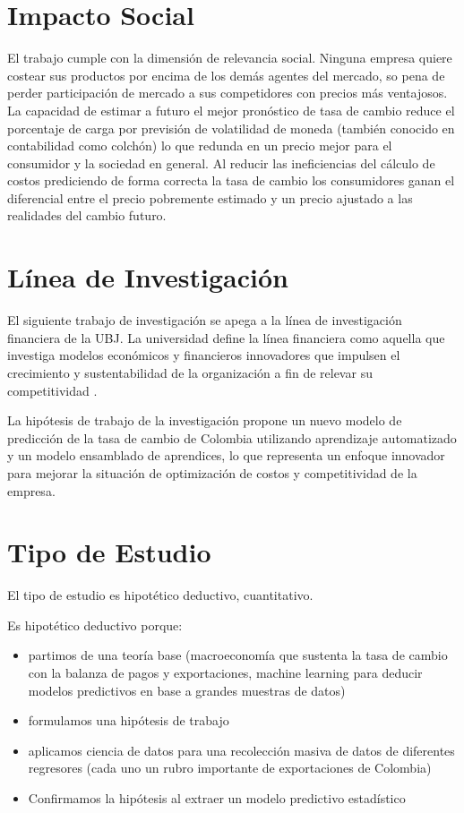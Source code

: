 \section{Impacto Social}
El trabajo cumple con la dimensión de relevancia social. Ninguna empresa quiere costear sus productos por encima de los demás agentes del mercado, so pena de perder participación de mercado a sus competidores con precios más ventajosos. La capacidad de estimar a futuro el mejor pronóstico de tasa de cambio reduce el porcentaje de carga por previsión de volatilidad de moneda (también conocido en contabilidad como colchón) lo que redunda en un precio mejor para el consumidor y la sociedad en general. Al reducir las ineficiencias del cálculo de costos prediciendo de forma correcta la tasa de cambio los consumidores ganan el diferencial entre el precio pobremente estimado y un precio ajustado a las realidades del cambio futuro.

\section{Línea de Investigación}
El siguiente trabajo de investigación se apega a la línea de investigación financiera de la UBJ. La universidad define la línea financiera como aquella que investiga modelos económicos y financieros innovadores que impulsen el crecimiento y sustentabilidad de la organización a fin de relevar su competitividad \cite{guiaAcademicaDAG}.

La hipótesis de trabajo de la investigación propone un nuevo modelo de predicción de la tasa de cambio de Colombia utilizando aprendizaje automatizado y un modelo ensamblado de aprendices, lo que representa un enfoque innovador para mejorar la situación de optimización de costos y competitividad de la empresa.

\section{Tipo de Estudio}
El tipo de estudio es hipotético deductivo, cuantitativo.

Es hipotético deductivo porque:

\begin{itemize}
\item partimos de una teoría base (macroeconomía que sustenta la tasa de cambio con la balanza de pagos y exportaciones, machine learning para deducir modelos predictivos en base a grandes muestras de datos)
\item formulamos una hipótesis de trabajo
\item aplicamos ciencia de datos para una recolección masiva de datos de diferentes regresores (cada uno un rubro importante de exportaciones de Colombia)
\item Confirmamos la hipótesis al extraer un modelo predictivo estadístico
\end{itemize}


